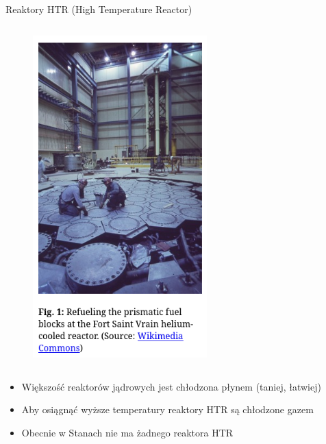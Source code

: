 \begin{columnframe}{Reaktory HTR (High Temperature Reactor)}
    \begin{column}{0.5\textwidth}
        \begin{figure}
            \centering
            \includegraphics[width=0.6\textwidth, frame]{images/ft_st_vrain_refuel.png}
        \end{figure}
    \end{column}
    \begin{column}{0.5\textwidth}
        \begin{itemize}
            \item Większość reaktorów jądrowych jest chłodzona płynem (taniej, łatwiej)
            \item Aby osiągnąć wyższe temperatury reaktory HTR są chłodzone gazem
            \item Obecnie w Stanach nie ma żadnego reaktora HTR
        \end{itemize}
    \end{column}
\end{columnframe}

